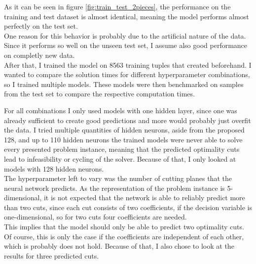 As it can be seen in figure \ref{fig:train_test_2pieces}, the performance on the training and test dataset is almost identical, meaning the model performs almost perfectly on the test set.\\
One reason for this behavior is probably due to the artificial nature of the data.
Since it performs so well on the unseen test set, I assume also good performance on completly new data.\\
After that, I trained the model on 8563 training tuples that created beforehand.
I wanted to compare the solution times for different hyperparameter combinations, so I trained multiple models.
These models were then benchmarked on samples from the test set to compare the respective computation times.

For all combinations I only used models with one hidden layer, since one was already sufficient to create good predictions and more would probably just overfit the data.
I tried multiple quantities of hidden neurons, aside from the proposed 128, and up to 110 hidden neurons the trained models were never able to solve every presented problem instance, meaning that the predicted optimality cuts lead to infeasibility or cycling of the solver.
Because of that, I only looked at models with 128 hidden neurons. \\
The hyperparameter left to vary was the number of cutting planes that the neural network predicts.
As the representation of the problem instance is 5-dimensional, it is not expected that the network is able to reliably predict more than two cuts, since each cut consists of two coefficients, if the decision variable is one-dimensional, so for two cuts four coefficients are needed. \\
This implies that the model should only be able to predict two optimality cuts.
Of course, this is only the case if the coefficients are independent of each other, which is probably does not hold.
Because of that, I also chose to look at the results for three predicted cuts.

